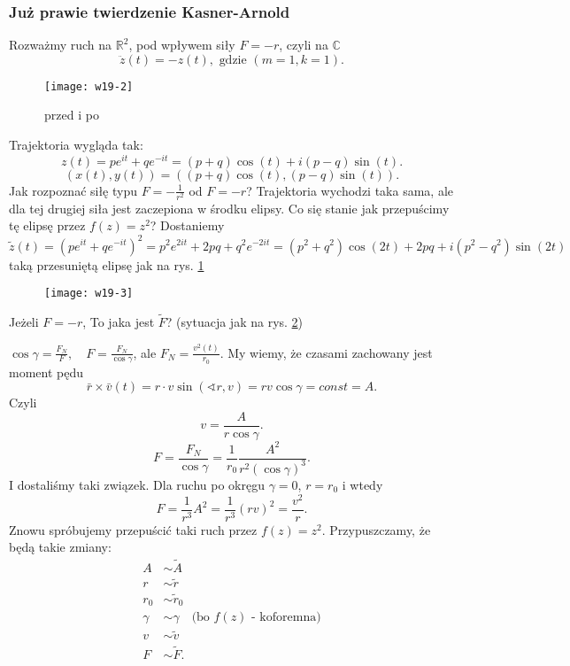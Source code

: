 \documentclass[../main.tex]{subfiles}
\begin{document}
\subsubsection{Już prawie twierdzenie Kasner-Arnold}
Rozważmy ruch na $\mathbb{R}^2$, pod wpływem siły $F = -r$, czyli na $\mathbb{C}$
 \[
     \ddot{z}(t) = -z(t),\text{ gdzie }\left( m = 1, k = 1 \right)
.\]
\begin{figure}[h]
    \centering
    \texttt{[image: w19-2]}
    \caption{przed i po}
    \label{fig:w19-2}
\end{figure}
Trajektoria wygląda tak:
\[
    z(t) = pe^{it} + qe^{-it} = \left( p+q \right) \cos(t) + i(p-q)\sin(t)
.\]
\[
    \left( x(t), y(t) \right) = \left((p+q)\cos(t), (p-q)\sin(t)\right)
.\]
Jak rozpoznać siłę typu $F = -\frac{1}{r^2}$ od $F = -r$? Trajektoria wychodzi taka sama, ale dla tej drugiej siła jest zaczepiona w środku elipsy. Co się stanie jak przepuścimy tę elipsę przez $f(z) = z^2$? Dostaniemy
\[
    \tilde z(t) = \left( p e^{it} + qe^{-it} \right) ^2 = p^2 e^{2it} + 2pq + q^2e^{-2it} = \left( p^2 + q^2 \right) \cos(2t) + 2pq + i(p^2 - q^2)\sin(2t)
\]
taką przesuniętą elipsę jak na rys. \ref{fig:w19-2}
\begin{pytanie}
    \begin{figure}[h]
        \centering
        \texttt{[image: w19-3]}
        \caption{}
        \label{fig:w19-3}
    \end{figure}
    Jeżeli $F = -r$, To jaka jest $\tilde F$? (sytuacja jak na rys. \ref{fig:w19-3})
\end{pytanie}
        $\cos\gamma = \frac{F_N}{F},\quad F = \frac{F_N}{\cos\gamma}$, ale $F_N = \frac{v^2(t)}{r_0}$. My wiemy, że czasami zachowany jest moment pędu
        \[
            \bar{r} \times \bar{v}(t) = r \cdot v \sin(\sphericalangle r, v) = r v \cos\gamma = const = A
        .\]
    Czyli
    \[
    v = \frac{A}{r \cos\gamma}
    .\]
\[
    F = \frac{F_N}{\cos\gamma} = \frac{1}{r_0}\frac{A^2}{r^2(\cos\gamma)^3}
.\]
I dostaliśmy taki związek. Dla ruchu po okręgu $\gamma = 0$,  $r = r_0$ i wtedy
\[
    F = \frac{1}{r^3}A^2 = \frac{1}{r^3}(r v)^2 = \frac{v^2}{r}
    .\]
Znowu spróbujemy przepuścić taki ruch przez $f(z) = z^2$. Przypuszczamy, że będą takie zmiany:
\begin{align*}
    A &\sim \tilde A\\
    r &\sim \tilde r\\
    r_0 &\sim \tilde r_0\\
    \gamma &\sim \gamma \quad \text{(bo $f(z)$ - koforemna)}\\
    v &\sim \tilde v\\
    F &\sim \tilde F
.\end{align*}
\end{document}
